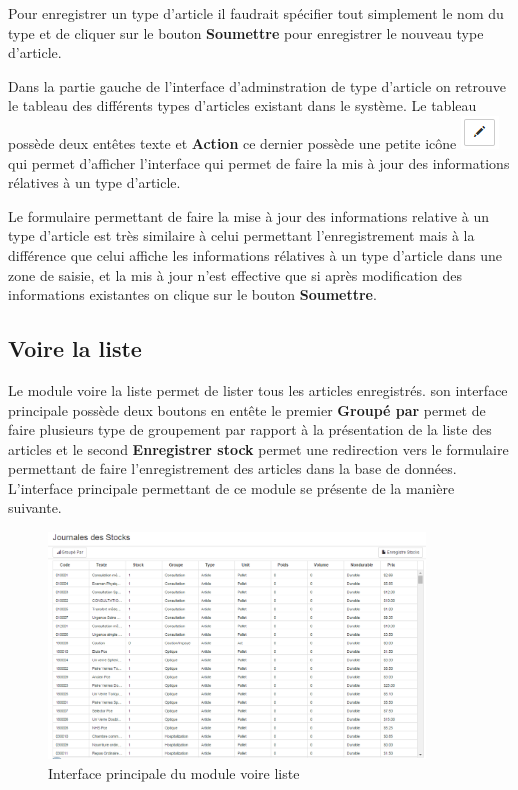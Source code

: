 \documentclass[12pt,a4paper]{report}
\begin{document}
Pour enregistrer un type d'article il faudrait spécifier tout simplement le nom du type et de cliquer sur le bouton \textbf{Soumettre} pour enregistrer le nouveau type d'article.

Dans la partie gauche de l'interface d'adminstration de type d'article on retrouve le tableau des différents types d'articles existant dans le système. Le tableau possède deux entêtes texte et \textbf{Action} ce dernier possède une petite icône \includegraphics[scale=0.7]{pic/EditBlack.png} qui permet d'afficher l'interface qui permet de faire la mis à jour des informations rélatives à un type d'article. 

Le formulaire permettant de faire la mise à jour des informations relative à un type d'article est très similaire à celui permettant l'enregistrement mais à la différence que celui affiche les informations rélatives à un type d'article dans une zone de saisie, et la mis à jour n'est effective que si après modification des informations existantes on clique sur le bouton \textbf{Soumettre}.

\newpage
\subsection{Voire la liste}
Le module voire la liste permet de lister tous les articles enregistrés. son interface principale possède deux boutons en entête le premier \textbf{Groupé par} permet de faire plusieurs type de groupement par rapport à la présentation de la liste des articles et le second \textbf{Enregistrer stock} permet une redirection vers le formulaire permettant de faire l'enregistrement des articles dans la base de données. L'interface principale permettant de ce module se présente de la manière suivante.

\begin{figure}[h]
\begin{center}
\includegraphics[width=10cm]{pic/JournalStock.png}
\end{center}
\caption{Interface principale du module voire liste}
\label{Interface principale du module voire liste}
\end{figure}
\end{document}
